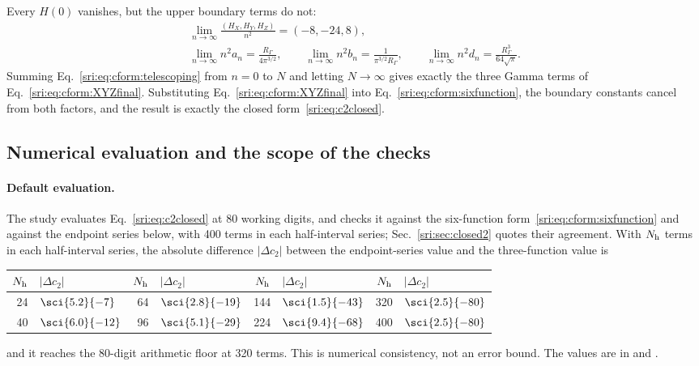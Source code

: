 Every $H(0)$ vanishes, but the upper boundary terms do not:
\begin{equation}
\begin{gathered}
 \lim_{n\to\infty}\frac{(H_X,H_Y,H_Z)}{n^2}=(-8,-24,8),\\
 \lim_{n\to\infty}n^2a_n=\frac{R_\Gamma}{4\pi^{3/2}},\qquad
 \lim_{n\to\infty}n^2b_n=\frac1{\pi^{3/2}R_\Gamma},\qquad
 \lim_{n\to\infty}n^2d_n=\frac{R_\Gamma^3}{64\sqrt\pi}.
\end{gathered}
\end{equation}
Summing Eq.~\eqref{sri:eq:cform:telescoping} from $n=0$ to $N$ and letting $N\to\infty$ gives exactly the three Gamma
terms of Eq.~\eqref{sri:eq:cform:XYZfinal}. Substituting Eq.~\eqref{sri:eq:cform:XYZfinal} into
Eq.~\eqref{sri:eq:cform:sixfunction}, the boundary constants cancel from both factors, and the result is exactly the closed
form~\eqref{sri:eq:c2closed}.

\subsection{Numerical evaluation and the scope of the checks}\label{sri:app:cform:numerics}
\paragraph{Default evaluation.} The study evaluates Eq.~\eqref{sri:eq:c2closed} at 80 working digits, and checks it against
the six-function form~\eqref{sri:eq:cform:sixfunction} and against the endpoint series below, with 400 terms in each
half-interval series; Sec.~\ref{sri:sec:closed2} quotes their agreement. With $N_{\rm h}$ terms in each half-interval
series, the absolute difference $|\Delta c_2|$ between the endpoint-series value and the three-function value is
\begin{center}\small
\begin{tabular}{@{}rl@{\qquad}rl@{\qquad}rl@{\qquad}rl@{}}
\toprule
$N_{\rm h}$ & $|\Delta c_2|$ & $N_{\rm h}$ & $|\Delta c_2|$ & $N_{\rm h}$ & $|\Delta c_2|$ & $N_{\rm h}$ & $|\Delta c_2|$\\
\midrule
24 & $\sci{5.2}{-7}$ & 64 & $\sci{2.8}{-19}$ & 144 & $\sci{1.5}{-43}$ & 320 & $\sci{2.5}{-80}$\\
40 & $\sci{6.0}{-12}$ & 96 & $\sci{5.1}{-29}$ & 224 & $\sci{9.4}{-68}$ & 400 & $\sci{2.5}{-80}$\\
\bottomrule
\end{tabular}
\end{center}
and it reaches the 80-digit arithmetic floor at 320 terms. This is numerical consistency, not an error bound. The values
are in  and .

